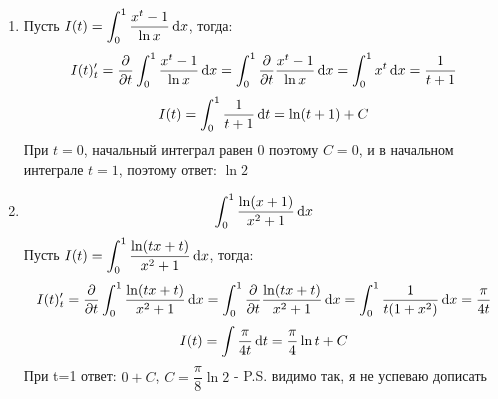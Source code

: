 \documentclass{report}
\begin{document}

\sol
\begin{enumerate}
	\item
	Пусть $I(t)=\displaystyle \int_{0}^{1} \dfrac{x^t-1}{\ln x} \dl x$, тогда:
	\begin{equation*}
		I(t)'_t=\dfrac{\partial}{\partial t} \int_{0}^{1} \dfrac{x^t-1}{\ln x} \dl x=\int_{0}^{1} \dfrac{\partial}{\partial t}\dfrac{x^t-1}{\ln x} \dl x=\int_{0}^{1} x^t \dl x=\dfrac{1}{t+1}
	\end{equation*}
	\begin{equation*}
		I(t)=\int_{0}^{1} \dfrac{1}{t+1} \dl t= \ln (t+1)+C
	\end{equation*}
	При $t=0$, начальный интеграл равен 0 поэтому $C=0$, и в начальном интеграле $t=1$, поэтому ответ: $\ln 2$\\
	\item
	\begin{equation*}
	\int_{0}^{1} \dfrac{\ln (x+1)}{x^2+1} \dl x
	\end{equation*}
		Пусть $\displaystyle I(t)=\int_0^1 \dfrac{\ln (tx+t)}{x^2+1} \dl x$, тогда:
	\begin{equation*}
		I(t)'_t=\dfrac{\partial}{\partial t} \int_0^1 \dfrac{\ln (tx+t)}{x^2+1} \dl x=\int_0^1 \dfrac{\partial}{\partial t} \dfrac{\ln (tx+t)}{x^2+1} \dl x=\int_0^1 \dfrac{1}{t(1+x^2)} \dl x=\dfrac{\pi}{4t}
	\end{equation*}
	\begin{equation*}
		I(t)=\int \dfrac{\pi}{4t} \dl t=\dfrac{\pi}{4}\ln t+C
	\end{equation*}
	При t=1 ответ: $0+C$, $C=\dfrac{\pi}{8}\ln 2$ - P.S. видимо так, я не успеваю дописать
\end{enumerate}
\end{document}
